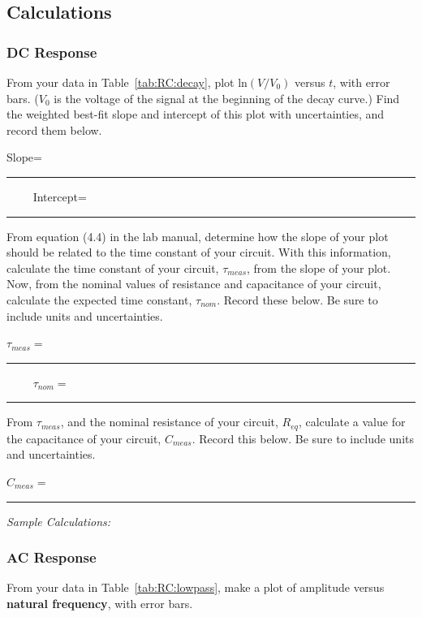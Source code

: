 \subsection{Calculations}

\subsubsection{DC Response}

From your data in Table~\ref{tab:RC:decay}, plot ln$(V/V_0)$ versus $t$, with error
bars. ($V_0$ is the voltage of the signal at the beginning of the decay curve.) Find
the weighted best-fit slope and intercept of this plot with uncertainties,
and record them below.

\begin{center}
Slope=~ \rule{3cm}{.1mm} ~~~~
Intercept=~ \rule{3cm}{.1mm}
\end{center} 
\vspace*{.5cm}

\noindent
From equation (4.4) in the lab manual, determine how the slope of your plot should be
related to the time constant of your circuit. With this information, 
calculate the time constant of your circuit, 
$\tau _{meas}$, from the slope of your plot. Now, from the nominal values of
resistance and capacitance of your circuit, calculate the expected time constant,
$\tau _{nom}$. Record these below. Be sure to include units and uncertainties.

\begin{center}
$\tau _{meas}=$~ \rule{3cm}{.1mm} ~~~~
$\tau _{nom}=$~ \rule{3cm}{.1mm}
\end{center}
\vspace*{.5cm}

\noindent
From $\tau _{meas}$, and the nominal resistance of your circuit, $R_{eq}$, calculate
a value for the capacitance of your circuit, $C_{meas}$. Record this below. Be sure to
include units and uncertainties.

\begin{center}
$C_{meas}=$~ \rule{3cm}{.1mm}
\end{center}

\noindent
{\it Sample Calculations:}
\newpage

\subsubsection{AC Response}

From your data in Table~\ref{tab:RC:lowpass}, make a plot of amplitude versus {\bf
natural frequency}, with error bars. 
\vspace*{.5cm}

